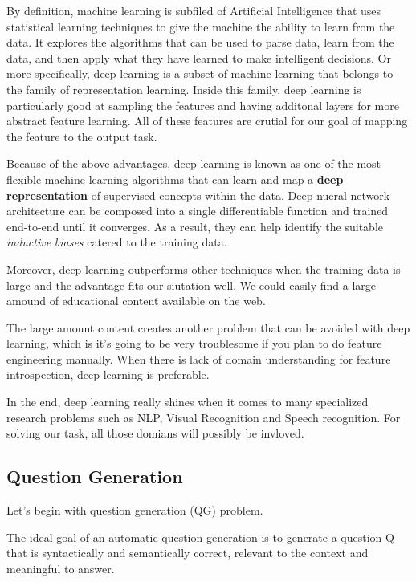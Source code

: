 \documentclass[]{book}
\theoremstyle{definition}
\theoremstyle{definition}
\theoremstyle{definition}
\theoremstyle{remark}
\begin{document}
By definition, machine learning is subfiled of Artificial Intelligence
that uses statistical learning techniques to give the machine the
ability to learn from the data. It explores the algorithms that can be
used to parse data, learn from the data, and then apply what they have
learned to make intelligent decisions. Or more specifically, deep
learning is a subset of machine learning that belongs to the family of
representation learning. Inside this family, deep learning is
particularly good at sampling the features and having additonal layers
for more abstract feature learning. All of these features are crutial
for our goal of mapping the feature to the output task.

Because of the above advantages, deep learning is known as one of the
most flexible machine learning algorithms that can learn and map a
\textbf{deep representation} of supervised concepts within the data.
Deep nueral network architecture can be composed into a single
differentiable function and trained end-to-end until it converges. As a
result, they can help identify the suitable \emph{inductive}
\emph{biases} catered to the training data.

Moreover, deep learning outperforms other techniques when the training
data is large and the advantage fits our siutation well. We could easily
find a large amound of educational content available on the web.

The large amount content creates another problem that can be avoided
with deep learning, which is it's going to be very troublesome if you
plan to do feature engineering manually. When there is lack of domain
understanding for feature introspection, deep learning is preferable.

In the end, deep learning really shines when it comes to many
specialized research problems such as NLP, Visual Recognition and Speech
recognition. For solving our task, all those domians will possibly be
invloved.

\subsection{Question Generation}\label{question-generation}

Let's begin with question generation (QG) problem.

The ideal goal of an automatic question generation is to generate a
question Q that is syntactically and semantically correct, relevant to
the context and meaningful to answer.
\end{document}
